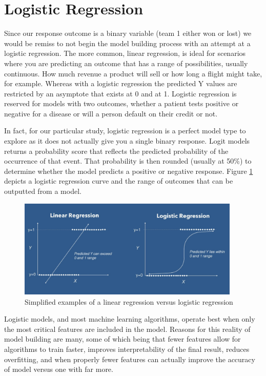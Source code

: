 \documentclass [MS] {uclathes}
\begin{document}
\section{Logistic Regression}
Since our response outcome is a binary variable (team 1 either won or lost) we would be remiss to not begin the model building process with an attempt at a logistic regression. The more common, linear regression, is ideal for scenarios where you are predicting an outcome that has a range of possibilities, usually continuous. How much revenue a product will sell or how long a flight might take, for example. Whereas with a logistic regression the predicted Y values are restricted by an asymptote that exists at 0 and at 1. Logistic regression is reserved for models with two outcomes, whether a patient tests positive or negative for a disease or will a person default on their credit or not.

In fact, for our particular study, logistic regression is a perfect model type to explore as it does not actually give you a single binary response. Logit models returns a probability score that reflects the predicted probability of the occurrence of that event. That probability is then rounded (usually at 50\%) to determine whether the model predicts a positive or negative response. Figure \ref{fig:logit} depicts a logistic regression curve and the range of outcomes that can be outputted from a model. 
 
\begin{figure}[h]
\centering
  \includegraphics[width=400px]{logistic-reg.png}
  \caption{Simplified examples of a linear regression versus logistic regression}
  \label{fig:logit}
\end{figure}

Logistic models, and most machine learning algorithms, operate best when only the most critical features are included in the model. Reasons for this reality of model building are many, some of which being that fewer features allow for algorithms to train faster, improves interpretability of the final result, reduces overfitting, and when properly fewer features can actually improve the accuracy of model versus one with far more.
\end{document}
